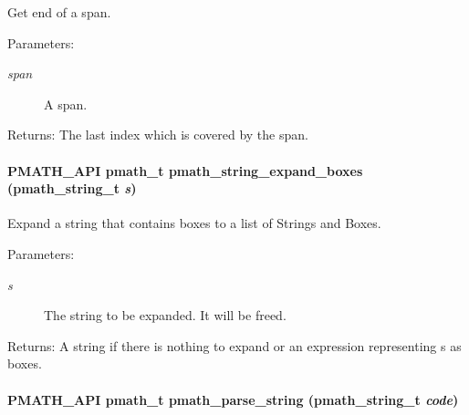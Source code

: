 Get end of a span. 

\begin{Desc}
\item[Parameters:]
\begin{description}
\item[{\em span}]A span. \end{description}
\end{Desc}
\begin{Desc}
\item[Returns:]The last index which is covered by the span. \end{Desc}
\hypertarget{group__parser_g78a874e9d0b6aca112bad336d319a1c1}{
\paragraph[{pmath\_\-string\_\-expand\_\-boxes}]{\setlength{\rightskip}{0pt plus 5cm}PMATH\_\-API {\bf pmath\_\-t} pmath\_\-string\_\-expand\_\-boxes ({\bf pmath\_\-string\_\-t} {\em s})}\hfill}
\label{group__parser_g78a874e9d0b6aca112bad336d319a1c1}


Expand a string that contains boxes to a list of Strings and Boxes. 

\begin{Desc}
\item[Parameters:]
\begin{description}
\item[{\em s}]The string to be expanded. It will be freed. \end{description}
\end{Desc}
\begin{Desc}
\item[Returns:]A string if there is nothing to expand or an expression representing s as boxes. \end{Desc}
\hypertarget{group__parser_g30c73f2fbcd116125cb5befd26b35ec4}{
\paragraph[{pmath\_\-parse\_\-string}]{\setlength{\rightskip}{0pt plus 5cm}PMATH\_\-API {\bf pmath\_\-t} pmath\_\-parse\_\-string ({\bf pmath\_\-string\_\-t} {\em code})}\hfill}
\label{group__parser_g30c73f2fbcd116125cb5befd26b35ec4}


